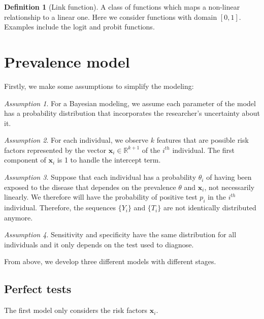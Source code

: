 \documentclass[a4paper, notitlepage, 11pt]{article}
\newcommand{\R}{\mathbb{R}}
\newcommand{\x}{\boldsymbol{x}}
\theoremstyle{definition}
\newtheorem{definition}{Definition}[section]
\theoremstyle{remark}
\newtheorem{assumption}{Assumption}
\begin{document}
\begin{definition}[Link function]
  A class of functions which maps a non-linear relationship to a linear one.
  Here we consider functions with domain $[0,1]$. Examples include the logit and probit
functions.
\end{definition}

\section{Prevalence model}

Firstly, we make some assumptions to simplify the modeling:

\begin{assumption}
  For a Bayesian modeling, we assume each parameter of the model
  has a probability distribution that incorporates the researcher's uncertainty about it. 
\end{assumption}

\begin{assumption}
  For each individual, we observe $k$ features that are possible
  risk factors represented by the vector $\x_i \in \R^{k+1}$ of the $i^{th}$ individual. The
  first component of $\x_i$ is 1 to handle the intercept term. 
\end{assumption}

\begin{assumption}
  Suppose that each individual has a probability $\theta_i$ of having been exposed
  to the disease that dependes on the prevalence $\theta$ and $\x_i$, not necessarily linearly.
  We therefore will have the probability of positive test $p_i$ in the
  $i^{th}$ individual. Therefore, the sequences $\{Y_i\}$ and $\{T_i\}$ are not
  identically distributed anymore.
\end{assumption} 

\begin{assumption}
  Sensitivity and specificity have the same distribution for all
  individuals and it only depends on the test used to diagnose. 
\end{assumption}

From above, we develop three different models with different stages.

\subsection{Perfect tests}

The first model only considers the risk factors $\x_i$. 
\end{document}
